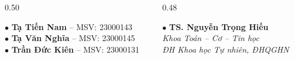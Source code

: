 \documentclass[aspectratio=169, 10pt]{beamer}
\begin{document}
\begin{frame}[plain]
  \vspace{0.1cm}

  \begin{columns}[t]
    \begin{column}{0.50\textwidth}
      \begin{tcolorbox}[colback=white, colframe=OceanNavy!40, arc=1.5mm, boxrule=0.8pt, title={\color{OceanNavy}\footnotesize\textbf{Sinh viên thực hiện (K68A2)}}]
        \footnotesize
        $\bullet$ \textbf{Tạ Tiến Nam} -- MSV: 23000143\\
        $\bullet$ \textbf{Tạ Văn Nghĩa} -- MSV: 23000145\\
        $\bullet$ \textbf{Trần Đức Kiên} -- MSV: 23000131
      \end{tcolorbox}
    \end{column}
    \begin{column}{0.48\textwidth}
      \begin{tcolorbox}[colback=white, colframe=OceanTeal!60, arc=1.5mm, boxrule=0.8pt, title={\color{OceanTeal}\footnotesize\textbf{Cán bộ hướng dẫn}}]
        \footnotesize
        $\bullet$ \textbf{TS. Nguyễn Trọng Hiếu}\\[2pt]
        \textit{Khoa Toán -- Cơ -- Tin học}\\
        \textit{ĐH Khoa học Tự nhiên, ĐHQGHN}
      \end{tcolorbox}
    \end{column}
  \end{columns}
\end{frame}
\end{document}
